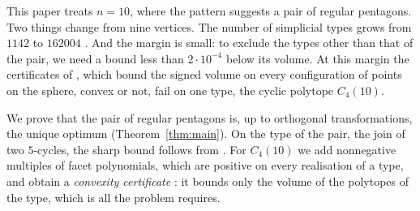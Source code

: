 This paper treats $n = 10$, where the pattern suggests a pair of regular
pentagons. Two things change from nine vertices. The number of simplicial
types grows from $1142$ \cite{altshuler-bokowski-steinberg-1980} to $162004$
\cite[Theorem~25(i) and Table~3]{firsching-2017}. And the margin is small:
to exclude the types other than that of the pair, we need a bound less than
$2 \cdot 10^{-4}$ below its volume. At this margin the certificates of
\cite{medgyes-maxvol-d4}, which bound the signed volume on every
configuration of points on the sphere, convex or not, fail on one type, the
cyclic polytope $C_{4}(10)$.

We prove that the pair of regular pentagons is, up to orthogonal
transformations, the unique optimum (Theorem~\ref{thm:main}). On the type of
the pair, the join of two $5$-cycles, the sharp bound follows from
\cite[Corollary~5.2]{medgyes-maxvol-d4-n9}. For $C_{4}(10)$ we add
nonnegative multiples of facet polynomials, which are positive on every
realisation of a type, and obtain a \emph{convexity certificate}
\cite[Section~5]{parrilo-2003}: it bounds only the volume of the polytopes of
the type, which is all the problem requires.
